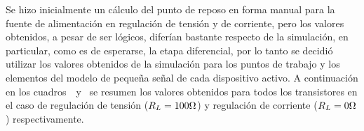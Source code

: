 
Se hizo inicialmente un cálculo del punto de reposo en forma manual para la fuente de alimentación en regulación de tensión y de corriente, pero los valores obtenidos, a pesar de ser lógicos, diferían bastante respecto de la simulación, en particular, como es de esperarse, la etapa diferencial, por lo tanto se decidió utilizar los valores obtenidos de la simulación para los puntos de trabajo y los elementos del modelo de pequeña señal de cada dispositivo activo.
A continuación en los cuadros~~y~ se resumen los valores obtenidos para todos los transistores en el caso de regulación de tensión ($R_{L}=100 \si[per-mode=symbol]{\ohm}$) y regulación de corriente ($R_{L}=0 \si[per-mode=symbol]{\ohm}$) respectivamente.



 
